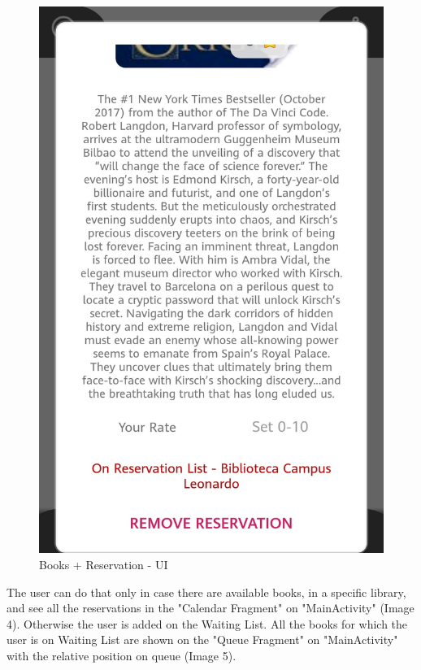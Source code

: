 \begin{figure}[H]
	\includegraphics[scale=0.15]{Images/UI/Book/3}
	\caption{Books + Reservation - UI}
\end{figure}
\vspace*{0mm}
The user can do that only in case there are available books, in a specific library, and see all the reservations in the "Calendar Fragment" on "MainActivity" (Image 4). Otherwise the user is added on the Waiting List. All the books for which the user is on Waiting List are shown on the "Queue Fragment" on "MainActivity" with the relative position on queue (Image 5).
